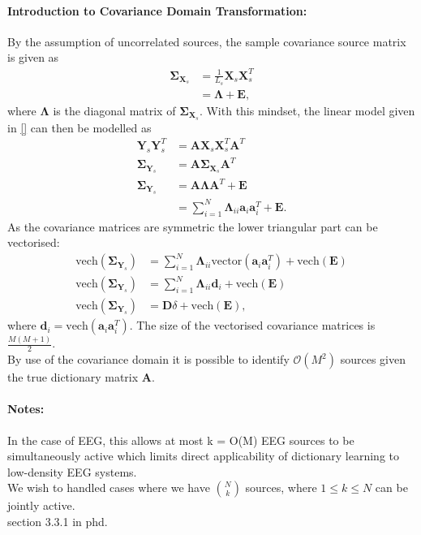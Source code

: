 \paragraph{Introduction to Covariance Domain Transformation:}
By the assumption of uncorrelated sources, the sample covariance source matrix is given as
\begin{align*}
\boldsymbol{\Sigma}_{\mathbf{X}_s} &= \frac{1}{L_s} \mathbf{X}_s \mathbf{X}_s^T \\
&= \boldsymbol{\Lambda} + \mathbf{E},
\end{align*}
where $\boldsymbol{\Lambda}$ is the diagonal matrix of $\boldsymbol{\Sigma}_{\mathbf{X}_s}$. With this mindset, the linear model given in \eqref{} can then be modelled as
\begin{align*}
\mathbf{Y}_s \mathbf{Y}_s^T &= \mathbf{AX}_s \mathbf{X}_s^T \mathbf{A}^T \\
\boldsymbol{\Sigma}_{\mathbf{Y}_s} &= \mathbf{A} \boldsymbol{\Sigma}_{\mathbf{X}_s} \mathbf{A}^T \\
\boldsymbol{\Sigma}_{\mathbf{Y}_s} &= \mathbf{A} \boldsymbol{\Lambda} \mathbf{A}^T + \mathbf{E} \\
&= \sum_{i=1}^N \boldsymbol{\Lambda}_{ii} \mathbf{a}_i \mathbf{a}_i^T + \mathbf{E}.
\end{align*}
As the covariance matrices are symmetric the lower triangular part can be vectorised:
\begin{align*}
\text{vech}(\boldsymbol{\Sigma}_{\mathbf{Y}_s}) &= \sum_{i=1}^N \boldsymbol{\Lambda}_{ii} \text{vector}(\mathbf{a}_i \mathbf{a}_i^T) + \text{vech}(\mathbf{E}) \\
\text{vech}(\boldsymbol{\Sigma}_{\mathbf{Y}_s}) &= \sum_{i=1}^N \boldsymbol{\Lambda}_{ii} \mathbf{d}_i + \text{vech}(\mathbf{E}) \\
\text{vech}(\boldsymbol{\Sigma}_{\mathbf{Y}_s}) &= \mathbf{D} \delta + \text{vech}(\mathbf{E}),
\end{align*}
where $\mathbf{d}_i = \text{vech}(\mathbf{a}_i \mathbf{a}_i^T)$. The size of the vectorised covariance matrices is $\frac{M(M+1)}{2}$.
\\
By use of the covariance domain it is possible to identify $\mathcal{O}(M^2)$ sources given the true dictionary matrix $\mathbf{A}$.


\paragraph{Notes:}
In the case of EEG, this allows at most k = O(M) EEG sources to be simultaneously active which limits direct applicability of dictionary learning to low-density EEG systems.
\\
We wish to handled cases where we have $\binom{N}{k}$ sources, where $1 \leq k \leq N$ can be jointly active. 
\\
section 3.3.1 in phd.
















